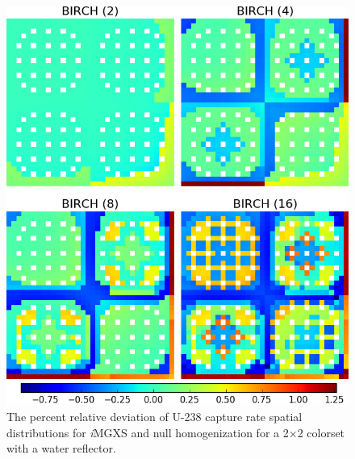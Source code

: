 \begin{figure}[h!]
\centering
\includegraphics[width=0.9\linewidth]{figures/results/compare/reflector/compare-capt}
\vspace{2mm}
\caption[U-238 capture rate \textit{i}MGXS-to-null relative deviations]{The percent relative deviation of U-238 capture rate spatial distributions for \textit{i}\ac{MGXS} and null homogenization for a 2$\times$2 colorset with a water reflector.}
\label{fig:chap11-refl-capt-rates-comp}
\end{figure}

\clearpage

